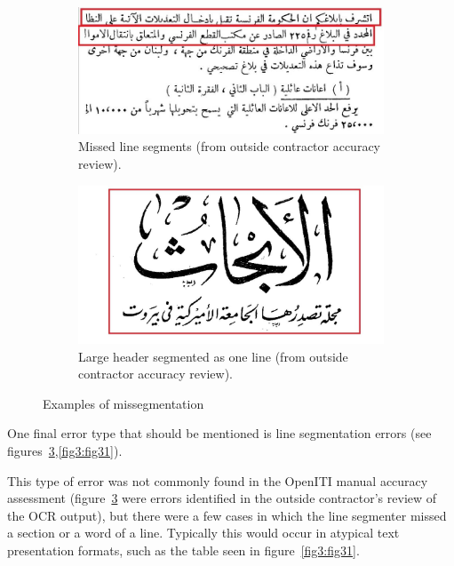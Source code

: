 \begin{figure}[H]
	\centering
	\begin{subfigure}[b]{0.48\linewidth}
	\centering
	\includegraphics[width=\linewidth]{images/image16.jpg}
	\caption{Missed line segments (from outside contractor accuracy review).}
	\label{fig3:fig29}
	\end{subfigure}
	\begin{subfigure}[b]{0.48\linewidth}
	\centering
	\includegraphics[width=\textwidth]{images/image17.jpg}
	\caption{Large header segmented as one line (from outside contractor accuracy review).}
	\label{fig3:fig30}
	\end{subfigure}
	\caption{Examples of missegmentation}
	\label{fig3:fig2930}
\end{figure} 

One final error type that should be mentioned is line segmentation errors (see
figures~\ref{fig3:fig2930},\ref{fig3:fig31}). 

This type of error was not commonly found in the OpenITI manual accuracy
assessment (figure~\ref{fig3:fig2930} were errors identified in the outside contractor’s
review of the OCR output), but there were a few cases in which the line
segmenter missed a section or a word of a line. Typically this would occur in
atypical text presentation formats, such as the table seen in figure~\ref{fig3:fig31}.

